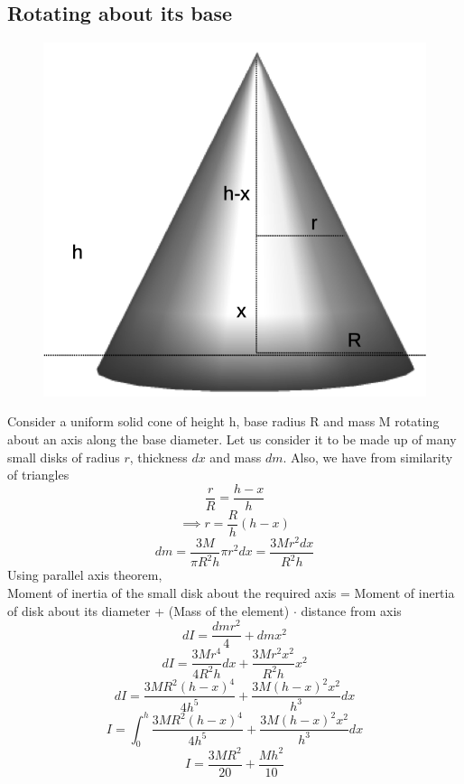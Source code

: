 \documentclass{article}
\begin{document}
\subsection{Rotating about its base}
\begin{figure}[h!]
  \centering
  \includegraphics[scale=0.3]{cone3.png}
\end{figure}
Consider a uniform solid cone of height h, base radius R and mass M rotating about an axis along the base diameter. Let us consider it to be made up of many small disks of radius $r$, thickness $dx$ and mass $dm$. Also, we have from similarity of triangles
$$\frac{r}{R} = \frac{h-x}{h}$$
$$\implies r = \frac{R}{h}(h-x)$$
$$dm = \frac{3M}{\pi R^2h}\pi r^2dx = \frac{3Mr^2dx}{R^2h}$$
Using parallel axis theorem,\\
Moment of inertia of the small disk about the required axis = Moment of inertia of disk about its diameter + (Mass of the element) $\cdot$ distance from axis
$$dI = \frac{dmr^2}{4} + dmx^2$$
$$dI = \frac{3Mr^4}{4R^2h} dx + \frac{3Mr^2x^2}{R^2h}x^2$$
$$dI = \frac{3MR^2(h-x)^4}{4h^5} + \frac{3M(h-x)^2x^2}{h^3} dx$$
$$I = \int_0^h \frac{3MR^2(h-x)^4}{4h^5} + \frac{3M(h-x)^2x^2}{h^3} dx$$
$$\boxed{I = \frac{3MR^2}{20} + \frac{Mh^2}{10}}$$
\end{document}
